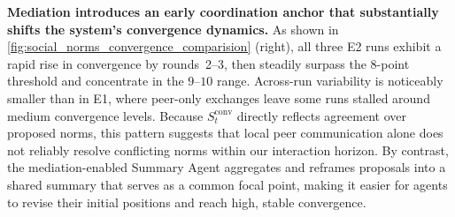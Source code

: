 
\textbf{Mediation introduces an early coordination anchor that substantially shifts the system’s convergence dynamics.} 
As shown in \autoref{fig:social_norms_convergence_comparision} (right), all three E2 runs exhibit a rapid rise in convergence by rounds~2--3, then steadily surpass the $8$-point threshold and concentrate in the $9$--$10$ range. 
Across-run variability is noticeably smaller than in E1, where peer-only exchanges leave some runs stalled around medium convergence levels. 
Because $S_t^{\text{conv}}$ directly reflects agreement over proposed norms, this pattern suggests that local peer communication alone does not reliably resolve conflicting norms within our interaction horizon. 
By contrast, the mediation-enabled Summary Agent aggregates and reframes proposals into a shared summary that serves as a common focal point, making it easier for agents to revise their initial positions and reach high, stable convergence.